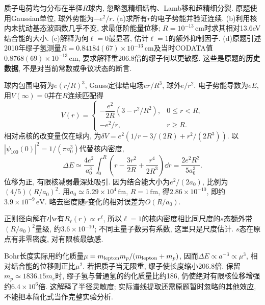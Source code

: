 \begin{exercise}
质子电荷均匀分布在半径$R$球内, 忽略氢精细结构、Lamb移和超精细分裂. 原题使用Gaussian单位, 球外势能为$-e^2/r$. (a)求所有$r$的电子势能并验证连续. (b)利用核内未扰动基态波函数几乎不变, 求最低阶能量位移; $R=10^{-13}\,\mathrm{cm}$时求其相对13.6eV结合能的大小. (c)解释为何$\ell=0$最显著, 估计$\ell=1$的额外抑制因子. (d)原题引述2010年缪子氢测量$R=0.84184(67)\times10^{-13}\,\mathrm{cm}$及当时CODATA值$0.8768(69)\times10^{-13}\,\mathrm{cm}$, 要求解释重206.8倍的缪子何以更敏感. 这些是原题的\textbf{历史数据}, 不是对当前常数或争议状态的断言.
\end{exercise}
\begin{solution}
球内包围电荷为$e(r/R)^3$, Gauss定律给电场$er/R^3$, 球外$e/r^2$. 电子势能导数为$eE$, 用$V(\infty)=0$并在$R$连续匹配得
\[
V(r)=\begin{cases}-\dfrac{e^2}{2R}(3-r^2/R^2),&0\leq r<R,\\-e^2/r,&r\geq R.\end{cases}
\]
相对点核的改变量仅在球内, 为$\delta V=e^2(1/r-3/(2R)+r^2/(2R^3))$. 以$|\psi_{100}(0)|^2=1/(\pi a_0^3)$代替核内密度,
\[
\Delta E\simeq\frac{4e^2}{a_0^3}\int_0^R\left(r-\frac{3r^2}{2R}+\frac{r^4}{2R^3}\right)\dd r
=\frac{2e^2R^2}{5a_0^3}.
\]
位移为正, 有限核减弱最深处吸引. 因为结合能大小为$e^2/(2a_0)$, 比例为$(4/5)(R/a_0)^2$. 用$a_0\simeq5.29\times10^4\,\mathrm{fm}$, $R=1\,\mathrm{fm}$, 得$2.86\times10^{-10}$, 即约$3.9\times10^{-9}\,\mathrm{eV}$. 略去密度随$r$变化的相对误差为$O(R/a_0)$.

正则径向解在小$r$有$R_\ell(r)\propto r^\ell$, 所以$\ell=1$的核内密度相比同尺度的$s$态额外带$(R/a_0)^2$量级, 约$3.6\times10^{-10}$; 不同主量子数另有系数, 这里只是尺度估计. $s$态在原点有非零密度, 对有限核最敏感.

Bohr长度实际用约化质量$\mu=m_{\rm lepton}m_p/(m_{\rm lepton}+m_p)$, 因而$\Delta E\propto a^{-3}\propto\mu^3$, 相对结合能的位移则正比$\mu^2$. 若把质子当无限重, 缪子使长度缩小206.8倍. 保留$m_p\simeq1836.15m_e$时, 缪子氢与普通氢的约化质量比约186, 仍使绝对有限核位移增强约$6.4\times10^6$倍. 这解释了半径灵敏度; 实际谱线提取还需原题暂时忽略的其他效应, 不能把本简化式当作完整实验分析.
\end{solution}
